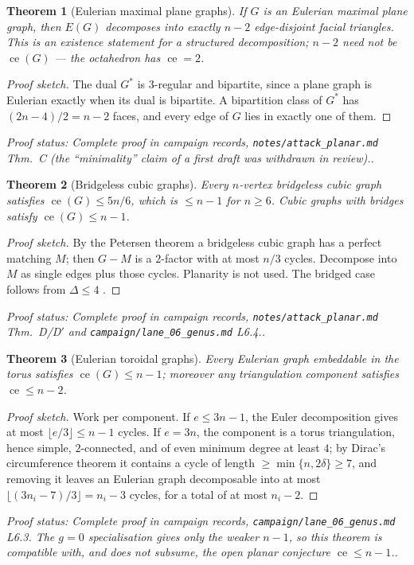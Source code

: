 \documentclass[a4paper,11pt]{amsart}
\newtheorem{theorem}{Theorem}[section]
\theoremstyle{definition}
\theoremstyle{remark}
\newcommand{\ce}{\operatorname{ce}}
\newcommand{\proofsrc}[1]{\par\smallskip\noindent\begin{sloppypar}\small\emph{Proof status: #1.}\end{sloppypar}\par\smallskip}
\begin{document}
\begin{theorem}[Eulerian maximal plane graphs]\label{thm:eulermaxplanar}
If $G$ is an Eulerian maximal plane graph, then $E(G)$ decomposes into exactly $n-2$ edge-disjoint facial
triangles. This is an existence statement for a structured decomposition; $n-2$ need not be $\ce(G)$ ---
the octahedron has $\ce=2$.
\end{theorem}
\begin{proof}[Proof sketch]
The dual $G^*$ is $3$-regular and bipartite, since a plane graph is Eulerian exactly when its dual is
bipartite. A bipartition class of $G^*$ has $(2n-4)/2=n-2$ faces, and every edge of $G$ lies in exactly one
of them.
\end{proof}
\proofsrc{Complete proof in campaign records, \texttt{notes/attack\_planar.md} Thm.~C (the ``minimality''
claim of a first draft was withdrawn in review).}

\begin{theorem}[Bridgeless cubic graphs]\label{thm:cubic}
Every $n$-vertex bridgeless cubic graph satisfies $\ce(G)\le 5n/6$, which is $\le n-1$ for $n\ge6$.
Cubic graphs with bridges satisfy $\ce(G)\le n-1$.
\end{theorem}
\begin{proof}[Proof sketch]
By the Petersen theorem \cite{Pe91} a bridgeless cubic graph has a perfect matching $M$; then $G-M$ is a
$2$-factor with at most $n/3$ cycles. Decompose into $M$ as single edges plus those cycles. Planarity is
not used. The bridged case follows from $\Delta\le4$ \cite{AABC25}.
\end{proof}
\proofsrc{Complete proof in campaign records, \texttt{notes/attack\_planar.md} Thm.~D/D$'$ and
\texttt{campaign/lane\_06\_genus.md} L6.4.}

\begin{theorem}[Eulerian toroidal graphs]\label{thm:eulertorus}
Every Eulerian graph embeddable in the torus satisfies $\ce(G)\le n-1$; moreover any triangulation
component satisfies $\ce\le n-2$.
\end{theorem}
\begin{proof}[Proof sketch]
Work per component. If $e\le 3n-1$, the Euler decomposition gives at most $\lfloor e/3\rfloor\le n-1$
cycles. If $e=3n$, the component is a torus triangulation, hence simple, $2$-connected, and of even
minimum degree at least $4$; by Dirac's circumference theorem \cite{Di52} it contains a cycle of length
$\ge\min\{n,2\delta\}\ge7$, and removing it leaves an Eulerian graph decomposable into at most
$\lfloor(3n_i-7)/3\rfloor=n_i-3$ cycles, for a total of at most $n_i-2$.
\end{proof}
\proofsrc{Complete proof in campaign records, \texttt{campaign/lane\_06\_genus.md} L6.3. The $g=0$
specialisation gives only the weaker $n-1$, so this theorem is compatible with, and does not subsume, the
open planar conjecture $\ce\le n-1$.}
\end{document}
